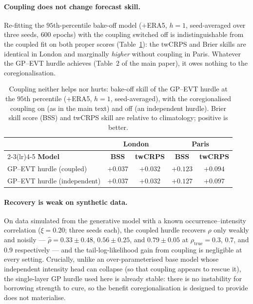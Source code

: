 \documentclass[11pt,a4paper]{article}
\begin{document}
\paragraph{Coupling does not change forecast skill.} Re-fitting the
$95$th-percentile bake-off model ($+$ERA5, $h=1$, seed-averaged over three seeds,
$600$ epochs) with the coupling switched off is indistinguishable from the coupled
fit on both proper scores (Table~\ref{tab:supp-couple}): the twCRPS and Brier
skills are identical in London and marginally \emph{higher} without coupling in
Paris. Whatever the GP--EVT hurdle achieves (Table~2 of the main paper), it owes
nothing to the coregionalisation.

\begin{table}[h]
\centering\small
\caption{Coupling neither helps nor hurts: bake-off skill of the GP--EVT hurdle at
the $95$th percentile ($+$ERA5, $h=1$, seed-averaged), with the coregionalised
coupling on (as in the main text) and off (an independent hurdle). Brier skill
score (BSS) and twCRPS skill are relative to climatology; positive is
better.}
\label{tab:supp-couple}
\begin{tabular}{lcccc}
\toprule
& \multicolumn{2}{c}{\textbf{London}} & \multicolumn{2}{c}{\textbf{Paris}}\\
\cmidrule(lr){2-3}\cmidrule(lr){4-5}
\textbf{Model} & \textbf{BSS} & \textbf{twCRPS} & \textbf{BSS} & \textbf{twCRPS} \\
\midrule
GP--EVT hurdle (coupled)      & $+0.037$ & $+0.032$ & $+0.123$ & $+0.094$ \\
GP--EVT hurdle (independent)  & $+0.037$ & $+0.032$ & $+0.127$ & $+0.097$ \\
\bottomrule
\end{tabular}
\end{table}

\paragraph{Recovery is weak on synthetic data.} On data simulated from the
generative model with a known occurrence--intensity correlation ($\xi=0.20$; three
seeds each), the coupled hurdle recovers $\rho$ only weakly and noisily ---
$\widehat\rho=0.33\pm0.48$, $0.56\pm0.25$, and $0.79\pm0.05$ at
$\rho_{\mathrm{true}}=0.3$, $0.7$, and $0.9$ respectively --- and the
tail-log-likelihood gain from coupling is negligible at every setting. Crucially,
unlike an over-parameterised base model whose independent intensity head can
collapse (so that coupling appears to rescue it), the single-layer GP hurdle used
here is already stable: there is no instability for borrowing strength to cure, so
the benefit coregionalisation is designed to provide does not materialise.
\end{document}
